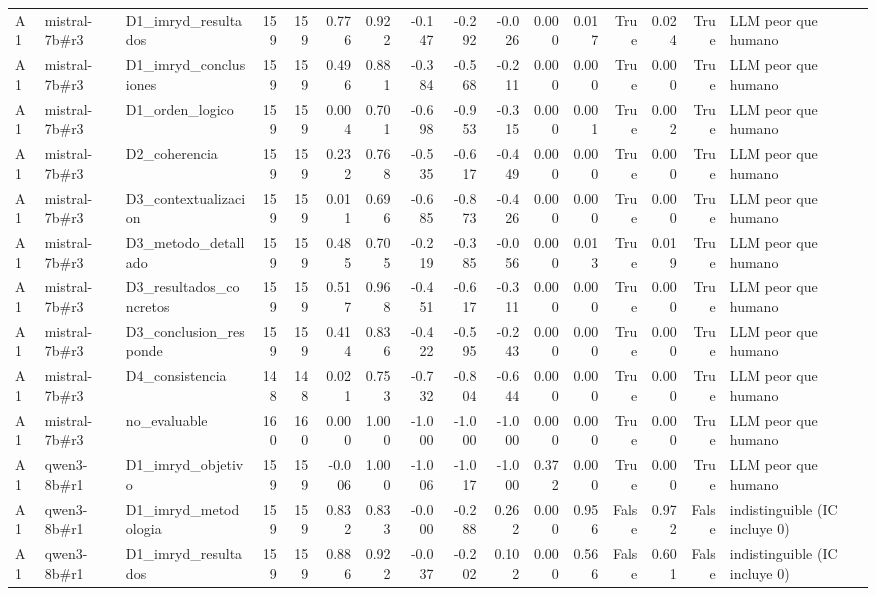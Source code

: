 \begin{table}
{\begin{tabular}{lllrrrrrrrrrrrrl}
A1 & mistral-7b\#r3 & D1\_imryd\_resultados & 159 & 159 & 0.776 & 0.922 & -0.147 & -0.292 & -0.026 & 0.000 & 0.017 & True & 0.024 & True & LLM peor que humano \\
A1 & mistral-7b\#r3 & D1\_imryd\_conclusiones & 159 & 159 & 0.496 & 0.881 & -0.384 & -0.568 & -0.211 & 0.000 & 0.000 & True & 0.000 & True & LLM peor que humano \\
A1 & mistral-7b\#r3 & D1\_orden\_logico & 159 & 159 & 0.004 & 0.701 & -0.698 & -0.953 & -0.315 & 0.000 & 0.001 & True & 0.002 & True & LLM peor que humano \\
A1 & mistral-7b\#r3 & D2\_coherencia & 159 & 159 & 0.232 & 0.768 & -0.535 & -0.617 & -0.449 & 0.000 & 0.000 & True & 0.000 & True & LLM peor que humano \\
A1 & mistral-7b\#r3 & D3\_contextualizacion & 159 & 159 & 0.011 & 0.696 & -0.685 & -0.873 & -0.426 & 0.000 & 0.000 & True & 0.000 & True & LLM peor que humano \\
A1 & mistral-7b\#r3 & D3\_metodo\_detallado & 159 & 159 & 0.485 & 0.705 & -0.219 & -0.385 & -0.056 & 0.000 & 0.013 & True & 0.019 & True & LLM peor que humano \\
A1 & mistral-7b\#r3 & D3\_resultados\_concretos & 159 & 159 & 0.517 & 0.968 & -0.451 & -0.617 & -0.311 & 0.000 & 0.000 & True & 0.000 & True & LLM peor que humano \\
A1 & mistral-7b\#r3 & D3\_conclusion\_responde & 159 & 159 & 0.414 & 0.836 & -0.422 & -0.595 & -0.243 & 0.000 & 0.000 & True & 0.000 & True & LLM peor que humano \\
A1 & mistral-7b\#r3 & D4\_consistencia & 148 & 148 & 0.021 & 0.753 & -0.732 & -0.804 & -0.644 & 0.000 & 0.000 & True & 0.000 & True & LLM peor que humano \\
A1 & mistral-7b\#r3 & no\_evaluable & 160 & 160 & 0.000 & 1.000 & -1.000 & -1.000 & -1.000 & 0.000 & 0.000 & True & 0.000 & True & LLM peor que humano \\
A1 & qwen3-8b\#r1 & D1\_imryd\_objetivo & 159 & 159 & -0.006 & 1.000 & -1.006 & -1.017 & -1.000 & 0.372 & 0.000 & True & 0.000 & True & LLM peor que humano \\
A1 & qwen3-8b\#r1 & D1\_imryd\_metodologia & 159 & 159 & 0.832 & 0.833 & -0.000 & -0.288 & 0.262 & 0.000 & 0.956 & False & 0.972 & False & indistinguible (IC incluye 0) \\
A1 & qwen3-8b\#r1 & D1\_imryd\_resultados & 159 & 159 & 0.886 & 0.922 & -0.037 & -0.202 & 0.102 & 0.000 & 0.566 & False & 0.601 & False & indistinguible (IC incluye 0) \\

\end{tabular}}
\end{table}
